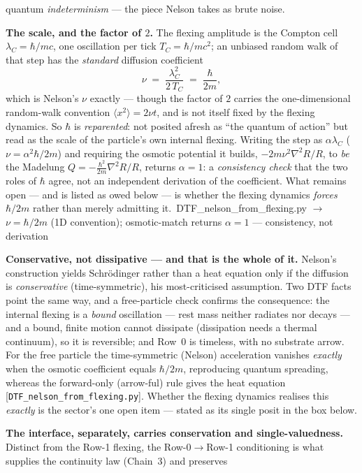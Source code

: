\documentclass[11pt]{article}
\newcommand{\pychip}[2]{{\footnotesize\colorbox{cbPyBg}{\ttfamily\,#1\,}\,{\color{gray}$\to$ #2}}}
\begin{document}
\begin{tcolorbox}[keybox]
quantum \emph{indeterminism} --- the piece Nelson takes as brute noise.
\par\smallskip
\textbf{The scale, and the factor of $2$.} The flexing amplitude is the Compton cell $\lambda_C=\hbar/mc$,
one oscillation per tick $T_C=\hbar/mc^2$; an unbiased random walk of that step has the \emph{standard}
diffusion coefficient
\[ \nu\;=\;\frac{\lambda_C^{2}}{2\,T_C}\;=\;\frac{\hbar}{2m}, \]
which is Nelson's $\nu$ exactly --- though the factor of $2$ carries the one-dimensional random-walk
convention $\langle x^2\rangle=2\nu t$, and is not itself fixed by the flexing dynamics. So $\hbar$ is
\emph{reparented}: not posited afresh as ``the quantum of action'' but read as the scale of the particle's
own internal flexing. Writing the step as $\alpha\lambda_C$ ($\nu=\alpha^2\hbar/2m$) and requiring the
osmotic potential it builds, $-2m\nu^2\nabla^2R/R$, to \emph{be} the Madelung $Q=-\tfrac{\hbar^2}{2m}\nabla^2R/R$,
returns $\alpha=1$: a \emph{consistency check} that the two roles of $\hbar$ agree, not an independent
derivation of the coefficient. What remains open --- and is listed as owed below --- is whether the flexing
dynamics \emph{forces} $\hbar/2m$ rather than merely admitting it.
\pychip{DTF\_nelson\_from\_flexing.py}{$\nu=\hbar/2m$ (1D convention); osmotic-match returns $\alpha{=}1$ --- consistency, not derivation}
\par\smallskip
\textbf{Conservative, not dissipative --- and that is the whole of it.} Nelson's construction yields
Schr\"odinger rather than a heat equation only if the diffusion is \emph{conservative} (time-symmetric),
his most-criticised assumption. Two DTF facts point the same way, and a free-particle check confirms the
consequence: the internal flexing is a \emph{bound} oscillation --- rest mass neither radiates nor decays
--- and a bound, finite motion cannot dissipate (dissipation needs a thermal continuum), so it is
reversible; and Row~0 is timeless, with no substrate arrow. For the free particle the time-symmetric
(Nelson) acceleration vanishes \emph{exactly} when the osmotic coefficient equals $\hbar/2m$, reproducing
quantum spreading, whereas the forward-only (arrow-ful) rule gives the heat equation
[\texttt{DTF\_nelson\_from\_flexing.py}]. Whether the flexing dynamics realises this \emph{exactly} is the
sector's one open item --- stated as its single posit in the box below.
\par\smallskip
\textbf{The interface, separately, carries conservation and single-valuedness.} Distinct from the Row-1
flexing, the Row-0$\to$Row-1 conditioning is what supplies the continuity law (Chain~3) and preserves

\end{tcolorbox}
\end{document}
